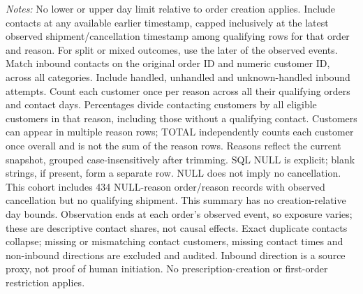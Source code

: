 \begin{table}[!htbp]
\begin{minipage}{\linewidth}
\footnotesize
\textit{Notes:} No lower or upper day limit relative to order creation applies.
Include contacts at any available earlier timestamp, capped inclusively at the
latest observed shipment/cancellation timestamp among
qualifying rows for that order and reason. For split or mixed outcomes, use the
later of the observed events. Match inbound contacts on the original order ID
and numeric customer ID, across all categories. Include handled, unhandled and unknown-handled inbound attempts.
Count each customer once per reason across all their qualifying orders and
contact days. Percentages divide contacting customers by all eligible customers
in that reason, including those without a qualifying contact. Customers can
appear in multiple reason rows; TOTAL independently counts each customer once
overall and is not the sum of the reason rows. Reasons reflect the current
snapshot, grouped case-insensitively after trimming. SQL NULL is explicit;
blank strings, if present, form a separate row. NULL does not imply no cancellation.
This cohort includes 434
NULL-reason order/reason records with observed cancellation but no qualifying
shipment. This summary has no creation-relative day bounds.
Observation ends at each order's observed
event, so exposure varies; these are descriptive contact shares, not causal effects.
Exact duplicate contacts collapse; missing or mismatching contact customers,
missing contact times and non-inbound directions are excluded and audited.
Inbound direction is a source proxy, not proof of human initiation.
No prescription-creation or first-order restriction applies.

\end{minipage}
\end{table}
